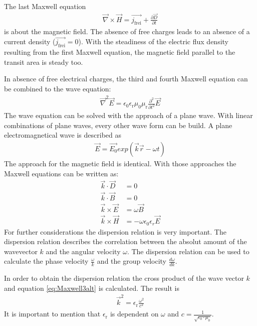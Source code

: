 \documentclass[twoside,english,headsepline=on,DIV=12]{scrartcl}
\numberwithin{equation}{section}
\begin{document}
The last Maxwell equation 
\begin{align}
\vec{\nabla} \times \vec{H} = \vec{j_\text{frei}} + \frac{\partial \vec{D}}{\partial t} \label{eq:Maxwell4}
\end{align}
is about the magnetic field. The absence of free charges leads to an absence of a current density ($\overrightarrow{j_\text{frei}} = 0$). With the steadiness of the electric flux density resulting from the first Maxwell equation, the magnetic field parallel to the transit area is steady too.

In absence of free electrical charges, the third and fourth Maxwell equation can be combined to the wave equation:
\begin{align}
\vec{\nabla}^2 \vec{E} = \epsilon_0 \epsilon_\text{r} \mu_0 \mu_\text{r} \frac{\partial^2}{\partial t^2} \vec{E} \label{eq:Waveequation}
\end{align} 
The wave equation can be solved with the approach of a plane wave. With linear combinations of plane waves, every other wave form can be build. A plane electromagnetical wave is described as
\begin{align}
\vec{E} = \vec{E_0} exp(\vec{k}\vec{r} - \omega t)
\end{align}
The approach for the magnetic field is identical. With those approaches the Maxwell equations can be written as:
\begin{align}
\vec{k} \cdot \vec{D} &= 0 \label{eq:Maxwell1alt} \\
\vec{k} \cdot \vec{B} &= 0 \label{eq:Maxwell2alt} \\
\vec{k} \times \vec{E} &= \omega \vec{B} \label{eq:Maxwell3alt} \\
\vec{k} \times \vec{H} &= -\omega \epsilon_0 \epsilon_r \vec{E} \label{eq:Maxwell4alt}
\end{align}
For further considerations the dispersion relation is very important. The dispersion relation describes the correlation between the absolut amount of the wavevector $k$ and the angular velocity $\omega$. The dispersion relation can be used to calculate the phase velocity $\frac{\omega}{k}$ and the group velocity $\frac{d\omega}{dk}$. 

In order to obtain the dispersion relation the cross product of the wave vector $k$ and equation \ref{eq:Maxwell3alt} is calculated. The result is
\begin{align}
\vec{k}^2 = \epsilon_\text{r} \frac{\omega^2}{c^2} \label{eq:Dispersionrelation}
\end{align}
It is important to mention that $\epsilon_\text{r}$ is dependent on $\omega$ and $c=\frac{1}{\sqrt{\epsilon_0 \cdot \mu_0}}$.
\end{document}
